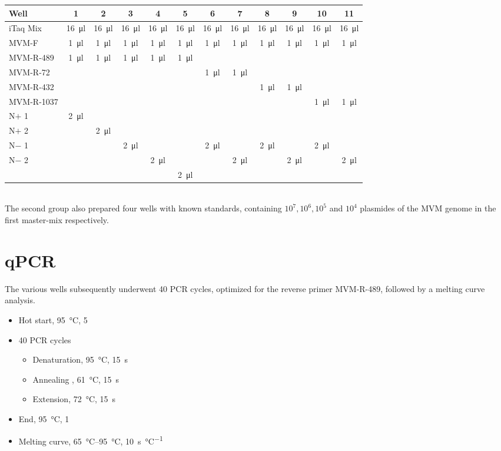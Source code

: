 \documentclass[a4paper,english]{scrreprt}
\begin{document}
\begin{tabu}{lccccccccccc}
	\toprule
	Well & 1 & 2 & 3 & 4 & 5 & 6 & 7 & 8 & 9 & 10 & 11 \\
	\midrule 
	iTaq Mix & \SI{16}{\ul} & \SI{16}{\ul} & \SI{16}{\ul} & \SI{16}{\ul} & \SI{16}{\ul} & \SI{16}{\ul} & \SI{16}{\ul} & \SI{16}{\ul} & \SI{16}{\ul} & \SI{16}{\ul} & \SI{16}{\ul} \\
	MVM-F & \SI{1}{\ul} & \SI{1}{\ul} & \SI{1}{\ul} & \SI{1}{\ul} & \SI{1}{\ul} & \SI{1}{\ul} & \SI{1}{\ul} & \SI{1}{\ul} & \SI{1}{\ul} & \SI{1}{\ul} & \SI{1}{\ul} \\
	MVM-R-489 & \SI{1}{\ul} & \SI{1}{\ul} & \SI{1}{\ul} & \SI{1}{\ul} & \SI{1}{\ul} &  &  &  &  &  &  \\
	MVM-R-72 & & & & & & \SI{1}{\ul} & \SI{1}{\ul} & & & & \\
	MVM-R-432 & & & & & & & & \SI{1}{\ul} & \SI{1}{\ul} & & \\
	MVM-R-1037 & & & & & & & & & & \SI{1}{\ul} & \SI{1}{\ul} \\
	N$+$ 1 & \SI{2}{\ul} & & & & & & & & & & \\
	N$+$ 2 & & \SI{2}{\ul} & & & & & & & & & \\
	N$-$ 1 & & & \SI{2}{\ul} & & & \SI{2}{\ul} & & \SI{2}{\ul} & & \SI{2}{\ul} & \\
	N$-$ 2 & & & & \SI{2}{\ul} & & & \SI{2}{\ul} & & \SI{2}{\ul} & & \SI{2}{\ul} \\
	 & & & & & \SI{2}{\ul} & & & & & & \\
	\bottomrule
\end{tabu}
\\

The second group also prepared four wells with known standards, containing
$10^7, 10^6, 10^5$ and $10^4$ plasmides of the MVM genome in the first
master-mix respectively.

\section{qPCR}

The various wells subsequently underwent 40 PCR cycles, optimized for the
reverse primer MVM-R-489, followed by a melting curve analysis.

\begin{itemize}
	\item Hot start, \SI{95}{\celsius}, \SI{5}{\min}
	\item 40 PCR cycles
		\begin{itemize}
			\item Denaturation, \SI{95}{\celsius}, \SI{15}{\s}
			\item Annealing , \SI{61}{\celsius}, \SI{15}{\s}
			\item Extension, \SI{72}{\celsius}, \SI{15}{\s}
		\end{itemize}
	\item End, \SI{95}{\celsius}, \SI{1}{\min}
	\item Melting curve, \SIrange{65}{95}{\celsius}, \SI{10}{\s \per \celsius}
\end{itemize}
\end{document}
